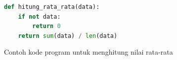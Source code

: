 \begin{figure}[H]
\begin{minipage}{\textwidth}
\begin{lstlisting}[language=Python]
def hitung_rata_rata(data):
    if not data:
        return 0
    return sum(data) / len(data)
\end{lstlisting}
\end{minipage}
\caption{Contoh kode program untuk menghitung nilai rata-rata}
\label{fig:contoh-kode}
\end{figure}
